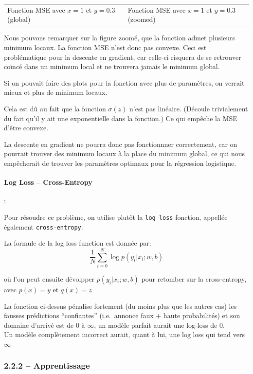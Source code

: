 \documentclass[
]{article}
\begin{document}
\begin{longtable}[]{@{}
  >{\centering\arraybackslash}p{}
  >{\centering\arraybackslash}p{}@{}}
Fonction MSE avec \(x = 1\) et \(y = 0.3\) (global) & Fonction MSE avec
\(x = 1\) et \(y = 0.3\) (zoomed) \\
\end{longtable}

Nous pouvons remarquer sur la figure zoomé, que la fonction admet
plusieurs minimum locaux. La fonction MSE n'est donc pas convexe. Ceci
est problématique pour la descente en gradient, car celle-ci risquera de
se retrouver coïncé dans un minimum local et ne trouvera jamais le
minimum global.

Si on pouvait faire des plots pour la fonction avec plus de paramètres,
on verrait mieux et plus de minimum locaux.

Cela est dû au fait que la fonction \(\sigma(z)\) n'est pas linéaire.
(Découle trivialement du fait qu'il y ait une exponentielle dans la
fonction.) Ce qui empêche la MSE d'être convexe.

La descente en gradient ne pourra donc pas fonctionnner correctement,
car on pourrait trouver des minimum locaux à la place du minimum global,
ce qui nous empêcherait de trouver les paramètres optimaux pour la
régression logistique.

\hypertarget{log-loss-cross-entropy}{%
\paragraph{Log Loss -- Cross-Entropy}\label{log-loss-cross-entropy}}

:

Pour résoudre ce problème, on utilise plutôt la \texttt{log\ loss}
fonction, appellée également \texttt{cross-entropy}.

La formule de la log loss function est donnée par: \[
\frac{1}{N} \sum_{i=0}^{N}{ \log p(y_i | x_i; w, b) }
\]

où l'on peut ensuite dévolpper \(p(y_i | x_i; w, b)\) pour retomber sur
la cross-entropy, avec \(p(x) = y\) et \(q(x) = z\)

La fonction ci-dessus pénalise fortement (du moins plus que les autres
cas) les fausses prédictions ``confiantes'' (i.e.~annonce faux + haute
probabilités) et son domaine d'arrivé est de 0 à \(\infty\), un modèle
parfait aurait une log-loss de 0.\\
Un modèle complètement incorrect aurait, quant à lui, une log loss qui
tend vers \(\infty\)

\hypertarget{apprentissage}{%
\subsubsection{2.2.2 -- Apprentissage}\label{apprentissage}}
\end{document}
